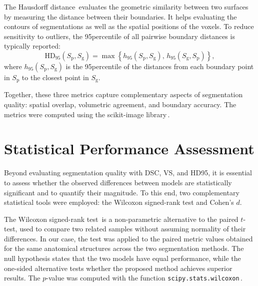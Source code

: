 The Hausdorff distance\,\cite{Hausdorff1991, FeTA2021_review} evaluates the geometric similarity between two surfaces by measuring the distance between their boundaries. It helps evaluating the contours of segmentations as well as the spatial positions of the voxels. To reduce sensitivity to outliers, the 95\th percentile of all pairwise boundary distances is typically reported:
\begin{equation}
    \text{HD}_{95}(S_\text{p}, S_\text{g}) = \max \left\{ h_{95}(S_\text{p}, S_\text{g}), \, h_{95}(S_\text{g}, S_\text{p}) \right\},
\end{equation}
where $h_{95}(S_\text{p}, S_\text{g})$ is the 95\th percentile of the distances from each boundary point in $S_\text{p}$ to the closest point in $S_\text{g}$.

Together, these three metrics capture complementary aspects of segmentation quality: spatial overlap, volumetric agreement, and boundary accuracy. The metrics were computed using the scikit-image library\,\cite{Walt2014, scikit-image}.

\section{Statistical Performance Assessment} \label{sec:StatisticalPerformanceAssessment}
Beyond evaluating segmentation quality with DSC, VS, and HD95, it is essential to assess whether the observed differences between models are statistically significant and to quantify their magnitude. To this end, two complementary statistical tools were employed: the Wilcoxon signed-rank test and Cohen's $d$.

The Wilcoxon signed-rank test\,\cite{Wilcoxon1945} is a non-parametric alternative to the paired $t$-test, used to compare two related samples without assuming normality of their differences. In our case, the test was applied to the paired metric values obtained for the same anatomical structures across the two segmentation methods. The null hypothesis states that the two models have equal performance, while the one-sided alternative tests whether the proposed method achieves superior results. The $p$-value was computed with the function \verb|scipy.stats.wilcoxon|\,\cite{SciPy}.

